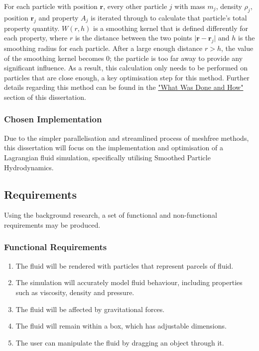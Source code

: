 \documentclass[a4paper, 12pt]{article}
\begin{document}
    For each particle with position $\textbf{r}$, every other particle $j$ with mass $m_j$, density $\rho_j$, position $\textbf{r}_j$ and property $A_j$ is iterated through to calculate that particle's total property quantity. $W(r, h)$ is a smoothing kernel that is defined differently for each property, where $r$ is the distance between the two points $\lvert\textbf{r} - \textbf{r}_j\rvert$ and $h$ is the smoothing radius for each particle. After a large enough distance $r > h$, the value of the smoothing kernel becomes 0; the particle is too far away to provide any significant influence. As a result, this calculation only needs to be performed on particles that are close enough, a key optimisation step for this method. Further details regarding this method can be found in the \hyperref[sec:whatwasdoneandhow]{"What Was Done and How"} section of this dissertation.

    \subsubsection{Chosen Implementation}

    Due to the simpler parallelisation and streamlined process of meshfree methods, this dissertation will focus on the implementation and optimisation of a Lagrangian fluid simulation, specifically utilising Smoothed Particle Hydrodynamics.

    \newpage

    \subsection{Requirements}

    Using the background research, a set of functional and non-functional requirements may be produced.

    \subsubsection{Functional Requirements}

    \begin{enumerate}[label=\textbf{F.R. \arabic*}]
        \item The fluid will be rendered with particles that represent parcels of fluid.
        \item The simulation will accurately model fluid behaviour, including properties such as viscosity, density and pressure.
        \item The fluid will be affected by gravitational forces.
        \item The fluid will remain within a box, which has adjustable dimensions.
        \item The user can manipulate the fluid by dragging an object through it.
    \end{enumerate}
\end{document}
